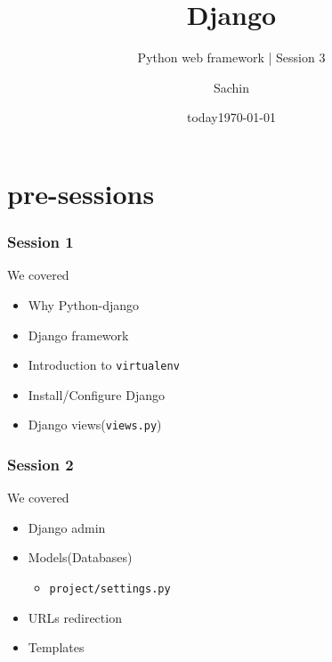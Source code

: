 \documentclass[bigger, presentation]{beamer}
\date{today}
\subtitle{Python web framework | Session 3}
\institute{Indian Institute of Technology Bombay}
\title{Django}
\author{Sachin}
\date{\today}
\begin{document}
\maketitle

\section{pre-sessions}
\label{sec-1}
\begin{frame}
\frametitle{Session 1}
\label{sec-1-1}

   We covered
   
\begin{itemize}
\item Why Python-django
\item Django framework
\item Introduction to \texttt{virtualenv}
\item Install/Configure Django
\item Django views(\texttt{views.py})
\end{itemize}
\end{frame}
\begin{frame}
\frametitle{Session 2}
\label{sec-1-2}

   
   We covered

\begin{itemize}
\item Django admin
\item Models(Databases)
\begin{itemize}
\item \texttt{project/settings.py}
\end{itemize}
\item URLs redirection
\item Templates
\end{itemize}
\end{frame}
\end{document}
